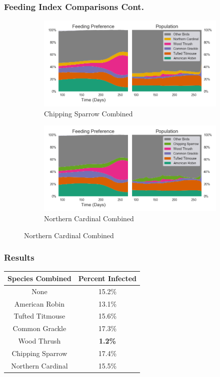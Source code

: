 \documentclass{beamer}
\begin{document}
\begin{frame}
\frametitle{Feeding Index Comparisons Cont.}
\begin{figure}
\begin{subfigure}{0.48\textwidth}
\includegraphics[width=\linewidth]{[4,6]_feedingindex.png}
\caption{Chipping Sparrow Combined} \label{fig:e}
\end{subfigure}\hspace*{\fill}
\begin{subfigure}{0.48\textwidth}
\includegraphics[width=\linewidth]{[5,6]_feedingindex.png}
\caption{Northern Cardinal Combined} \label{fig:g}
\end{subfigure}
\end{figure}
\end{frame}




\begin{frame}
\frametitle{Results}
\begin{center}
\begin{tabular}{ |c|c| } 
 \hline
 Species Combined & Percent Infected \\ [0.5ex] 
 \hline\hline
 \hline
 None & 15.2\% \\ 
 American Robin & 13.1\% \\ 
 Tufted Titmouse  & 15.6\% \\
 Common Grackle &  17.3\%      \\
 Wood Thrush &  \textbf{1.2\%}   \\
 Chipping Sparrow &  17.4\%   \\
 Northern Cardinal & 15.5\%    \\ 
 \hline
\end{tabular}
\end{center}
\end{frame}
\end{document}
